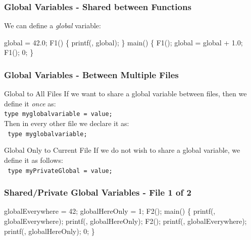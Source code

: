 \documentclass[smaller,handout,table]{beamer}
\begin{document}
\begin{frame}[fragile]
\frametitle{Global Variables - Shared between Functions}
We can define a \emph{global} variable:
\begin{semiverbatim}
\small
\kr\kl{} 
\kl
\kl{} global = 42.0;
\kl
\kl{} F1()
\kl\{
\kl   printf(, global);
\kl\}
\kl
\kl{} main()
\kl\{
\kl   F1();
\kl   global = global + 1.0;
\kl   F1();
\kl   {} 0;
\kl\}
\end{semiverbatim}
\end{frame}

\begin{frame}
\frametitle{Global Variables - Between Multiple Files}
\begin{exampleblock}{Global to All Files}
If we want to share a global variable between files,
then we define it \emph{once} as:\\
{\tt type myglobalvariable = value;}\\
Then in every other file we declare it as:\\
{\tt {} type myglobalvariable;}
\end{exampleblock}

\begin{alertblock}{Global Only to Current File}
If we do not wish to share a global variable, we
define it as follows:\\
{\tt {} type myPrivateGlobal = value;}
\end{alertblock}
\end{frame}

\begin{frame}[fragile]
\frametitle{Shared/Private Global Variables - File 1 of 2}
\begin{semiverbatim}
\footnotesize
\kr\kl{} 
\kl
\kl{} globalEverywhere = 42;
\kl{} globalHereOnly = 1;
\kl
\kl{} F2(); 
\kl
\kl{} main()
\kl\{
\kl   printf(, globalEverywhere);
\kl   printf(, globalHereOnly);
\kl
\kl   F2();
\kl
\kl   printf(, globalEverywhere);
\kl   printf(, globalHereOnly);
\kl
\kl   {} 0;
\kl\}
\end{semiverbatim}
\end{frame}
\end{document}
